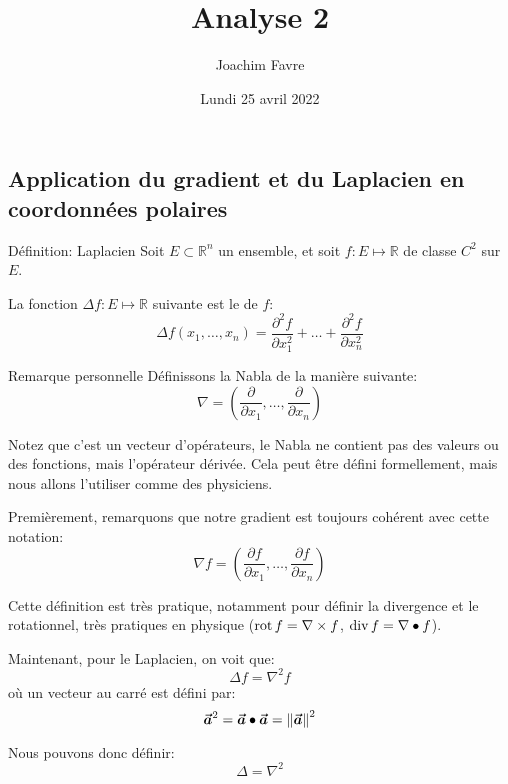 \documentclass[a4paper]{article}
\title{Analyse 2}
\author{Joachim Favre}
\date{Lundi 25 avril 2022}
\begin{document}
\maketitle


\subsection[Dérivées en coordonnées polaires]{Application du gradient et du Laplacien en coordonnées polaires}
\begin{parag}{Définition: Laplacien}
    Soit $E \subset \mathbb{R}^n$ un ensemble, et soit $f : E \mapsto \mathbb{R}$ de classe $C^2$ sur $E$.

    La fonction $\Delta f : E \mapsto \mathbb{R}$ suivante est le  de $f$: 
    \[\Delta f\left(x_1, \ldots, x_n\right) = \frac{\partial^{2} f}{\partial x_1^{2}} + \ldots + \frac{\partial^{2} f}{\partial x_n^{2}}\]
    
    \begin{subparag}{Remarque personnelle}
        Définissons la Nabla de la manière suivante: 
        \[\nabla = \left(\frac{\partial}{\partial x_1}, \ldots, \frac{\partial}{\partial x_n}\right)\]

        Notez que c'est un vecteur d'opérateurs, le Nabla ne contient pas des valeurs ou des fonctions, mais l'opérateur dérivée. Cela peut être défini formellement, mais nous allons l'utiliser comme des physiciens.

        Premièrement, remarquons que notre gradient est toujours cohérent avec cette notation: 
        \[\nabla f = \left(\frac{\partial f}{\partial x_1}, \ldots, \frac{\partial f}{\partial x_n}\right)\]
        
        Cette définition est très pratique, notamment pour définir la divergence et le rotationnel, très pratiques en physique ($\operatorname{rot} f = \nabla \times f$, $\operatorname{div} f = \nabla \bullet f$).

        Maintenant, pour le Laplacien, on voit que: 
        \[\Delta f = \nabla^2 f\]
        où un vecteur au carré est défini par: 
        \[\bvec{a}^2 = \bvec{a} \dotprod \bvec{a} = \left\|\bvec{a}\right\|^2\]

        Nous pouvons donc définir: 
        \[\Delta = \nabla^2\]
    \end{subparag}
\end{parag}
\end{document}
